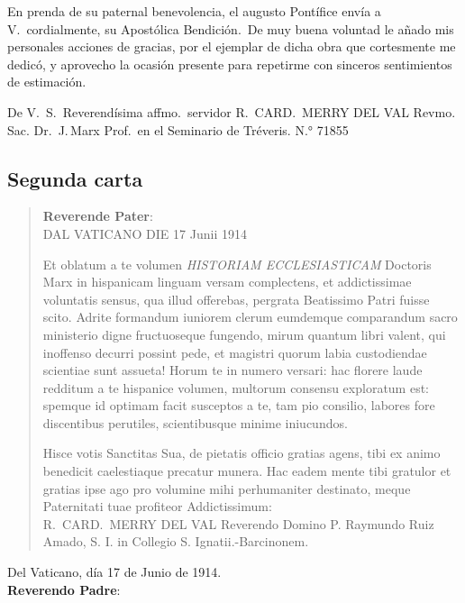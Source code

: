 \raggedbottom{} \documentclass[12pt, a4paper, openany]{book} %
\begin{document}
En prenda de su paternal benevolencia, el augusto Pontífice envía a V.\ cordialmente, su Apostólica Bendición.\  De muy buena voluntad le añado mis personales acciones de gracias, por el ejemplar de dicha obra que cortesmente me dedicó, y aprovecho la ocasión presente para repetirme con sinceros sentimientos de estimación.

De V.\ S.\ Reverendísima affmo.\ servidor
R.\, CARD.\, MERRY DEL VAL
Revmo. Sac. Dr.\, J.\,Marx Prof.\ en el Seminario de Tréveris.
N.° 71855
\subsection{Segunda carta}
\begin{quotation}
  \begin{flushright}
    \textbf{Reverende Pater}:\\
    DAL VATICANO DIE 17 Junii 1914
  \end{flushright}

  \noindent Et oblatum a te volumen \textit{HISTORIAM ECCLESIASTICAM} Doctoris Marx in hispanicam linguam versam complectens, et addictissimae voluntatis sensus, qua illud offerebas, pergrata Beatissimo Patri fuisse scito. Adrite formandum iuniorem clerum eumdemque comparandum sacro ministerio digne fructuoseque fungendo, mirum quantum libri valent, qui inoffenso decurri possint pede, et magistri quorum labia custodiendae scientiae sunt assueta! Horum te in numero versari: hac florere laude redditum a te hispanice volumen, multorum consensu exploratum est: spemque id optimam facit susceptos a te, tam pio consilio, labores fore discentibus perutiles, scientibusque minime iniucundos.

  Hisce votis Sanctitas Sua, de pietatis officio gratias agens, tibi ex animo benedicit caelestiaque precatur munera. Hac eadem mente tibi gratulor et gratias ipse ago pro volumine mihi perhumaniter destinato, meque Paternitati tuae profiteor Addictissimum:\\
  R.\ CARD.\ MERRY DEL VAL
  Reverendo Domino P. Raymundo Ruiz Amado, S. I. in Collegio
  S. Ignatii.-Barcinonem.
\end{quotation}
\newpage
\begin{flushright}
  Del Vaticano, día 17 de Junio de 1914.\\
  \textbf{Reverendo Padre}:
\end{flushright}
\end{document}
